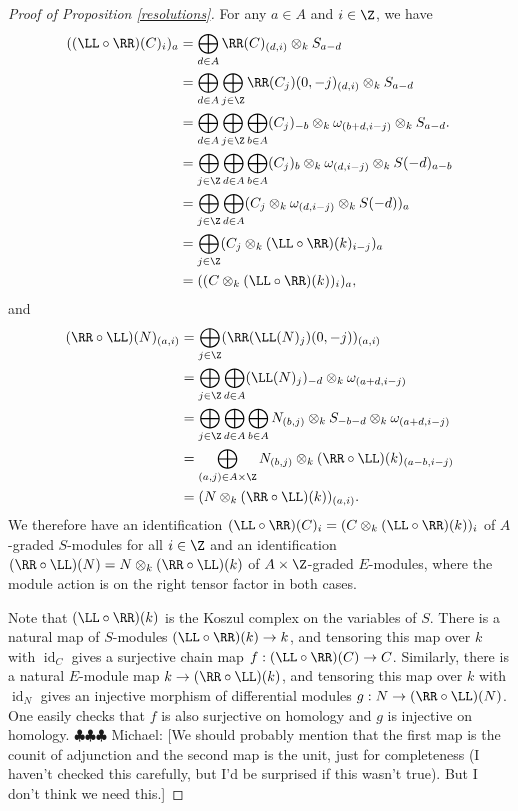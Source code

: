 \documentclass[12pt]{amsart}
\theoremstyle{definition}
\theoremstyle{remark}
\newcommand{\id}{\operatorname{id}}
\newcommand{\michael}[1]{{\color{red} \sf $\clubsuit\clubsuit\clubsuit$ Michael: [#1]}}
\def\om{\omega}
\def\om{\omega}
\begin{document}
\begin{proof}[Proof of Proposition \ref{resolutions}]
For any $a \in A$ and $i \in \Z$, we have
\begin{align*}
((\LL \circ \RR)(C)_i)_a &= \bigoplus_{d \in A} \RR(C)_{(d, i)} \otimes_k S_{a - d} \\
&= \bigoplus_{d \in A} \bigoplus_{j \in \Z} \RR(C_j)(0, -j)_{(d, i)} \otimes_k S_{a - d} \\
&= \bigoplus_{d \in A} \bigoplus_{j \in \Z} \bigoplus_{b \in A} (C_j)_{-b} \otimes_k \om_{(b + d, i - j)} \otimes_k S_{a - d}. \\
&= \bigoplus_{j \in \Z} \bigoplus_{d \in A} \bigoplus_{b \in A} (C_j)_b \otimes_k   \om_{(d, i - j)} \otimes_k S(-d)_{a - b} \\
&= \bigoplus_{j \in \Z} \bigoplus_{d \in A} (C_j \otimes_k   \om_{(d, i - j)} \otimes_k S(-d))_a \\
&= \bigoplus_{j \in \Z} (C_j \otimes_k  (\LL \circ \RR)(k)_{i - j} )_a \\
&= ((C \otimes_k  (\LL \circ \RR)(k))_i)_a,
\end{align*}
and 
\begin{align*}
(\RR \circ \LL)(N)_{(a, i)} &= \bigoplus_{j \in \Z} (\RR(\LL(N)_j)(0, -j))_{(a, i)} \\
&= \bigoplus_{j \in \Z}  \bigoplus_{d \in A} (\LL(N)_j)_{-d} \otimes_k \om_{(a + d, i-j)} \\
&= \bigoplus_{j \in \Z}  \bigoplus_{d \in A} \bigoplus_{b \in A} N_{(b,j)} \otimes_k S_{-b-d} \otimes_k \om_{(a + d, i-j)} \\
&= \bigoplus_{(a,j) \in A \times \Z} N_{(b,j)} \otimes_k (\RR \circ \LL)(k)_{(a-b,i-j)} \\
&= (N \otimes_k (\RR \circ \LL)(k))_{(a, i)}.
\end{align*}
We therefore have an identification $(\LL \circ \RR)(C)_i = (C \otimes_k  (\LL \circ \RR)(k))_i$ of $A$-graded $S$-modules for all $i \in \Z$ and an identification $(\RR \circ \LL)(N) = N \otimes_k (\RR \circ \LL)(k)$ of $A \times \Z$-graded $E$-modules, where the module action is on the right tensor factor in both cases.

Note that $(\LL \circ \RR)(k)$ is the Koszul complex on the variables of $S$. There is a natural map of $S$-modules $(\LL \circ \RR)(k) \to k$, and tensoring this map over $k$ with $\id_C$ gives a surjective chain map $f: (\LL \circ \RR)(C) \to C$. Similarly, there is a natural $E$-module map $k \to (\RR \circ \LL)(k)$, and tensoring this map over $k$ with $\id_N$ gives an injective morphism of differential modules $g: N \to (\RR \circ \LL)(N)$. One easily checks that $f$ is also surjective on homology and $g$ is injective on homology. \michael{We should probably mention that the first map is the counit of adjunction and the second map is the unit, just for completeness (I haven't checked this carefully, but I'd be surprised if this wasn't true). But I don't think we need this.}


\end{proof}
\end{document}
